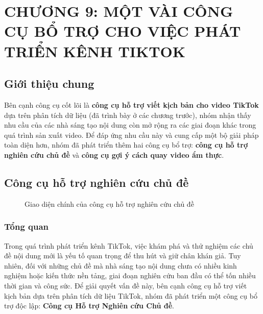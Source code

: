 \section{CHƯƠNG 9: MỘT VÀI CÔNG CỤ BỔ TRỢ CHO VIỆC PHÁT TRIỂN KÊNH TIKTOK} \label{sec:aux_tool}

\subsection{Giới thiệu chung}

Bên cạnh công cụ cốt lõi là \textbf{công cụ hỗ trợ viết kịch bản cho video TikTok} dựa trên phân tích dữ liệu (đã trình bày ở các chương trước), nhóm nhận thấy nhu cầu của các nhà sáng tạo nội dung còn mở rộng ra các giai đoạn khác trong quá trình sản xuất video. Để đáp ứng nhu cầu này và cung cấp một bộ giải pháp toàn diện hơn, nhóm đã phát triển thêm hai công cụ bổ trợ: \textbf{công cụ hỗ trợ nghiên cứu chủ đề} và \textbf{công cụ gợi ý cách quay video ẩm thực}.

\subsection{Công cụ hỗ trợ nghiên cứu chủ đề}

\begin{figure}[H]
    \centering
    \caption{Giao diện chính của công cụ hỗ trợ nghiên cứu chủ đề}
    \label{fig:research_main_page}
\end{figure}

\subsubsection{Tổng quan}

Trong quá trình phát triển kênh TikTok, việc khám phá và thử nghiệm các chủ đề nội dung mới là yếu tố quan trọng để thu hút và giữ chân khán giả. Tuy nhiên, đối với những chủ đề mà nhà sáng tạo nội dung chưa có nhiều kinh nghiệm hoặc kiến thức nền tảng, giai đoạn nghiên cứu ban đầu có thể tốn nhiều thời gian và công sức. Để giải quyết vấn đề này, bên cạnh công cụ hỗ trợ viết kịch bản dựa trên phân tích dữ liệu TikTok, nhóm đã phát triển một công cụ bổ trợ độc lập: \textbf{Công cụ Hỗ trợ Nghiên cứu Chủ đề}.

